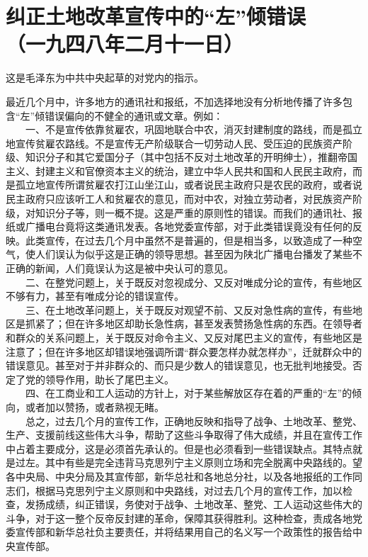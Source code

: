 \documentclass[cn,11pt,chinese]{elegantbook}
\def\myformat#1{\hfil\hfil #1}
\begin{document}
\newpage\section*{\myformat{纠正土地改革宣传中的“左”倾错误}\\\myformat{（一九四八年二月十一日）}}
\begin{introduction}\item  这是毛泽东为中共中央起草的对党内的指示。\end{introduction}
最近几个月中，许多地方的通讯社和报纸，不加选择地没有分析地传播了许多包含“左”倾错误偏向的不健全的通讯或文章。例如：\\
　　一、不是宣传依靠贫雇农，巩固地联合中农，消灭封建制度的路线，而是孤立地宣传贫雇农路线。不是宣传无产阶级联合一切劳动人民、受压迫的民族资产阶级、知识分子和其它爱国分子（其中包括不反对土地改革的开明绅士），推翻帝国主义、封建主义和官僚资本主义的统治，建立中华人民共和国和人民民主政府，而是孤立地宣传所谓贫雇农打江山坐江山，或者说民主政府只是农民的政府，或者说民主政府只应该听工人和贫雇农的意见，而对中农，对独立劳动者，对民族资产阶级，对知识分子等，则一概不提。这是严重的原则性的错误。而我们的通讯社、报纸或广播电台竟将这类通讯发表。各地党委宣传部，对于此类错误竟没有任何的反映。此类宣传，在过去几个月中虽然不是普遍的，但是相当多，以致造成了一种空气，使人们误认为似乎这是正确的领导思想。甚至因为陕北广播电台播发了某些不正确的新闻，人们竟误认为这是被中央认可的意见。\\
　　二、在整党问题上，关于既反对忽视成分、又反对唯成分论的宣传，有些地区不够有力，甚至有唯成分论的错误宣传。\\
　　三、在土地改革问题上，关于既反对观望不前、又反对急性病的宣传，有些地区是抓紧了；但在许多地区却助长急性病，甚至发表赞扬急性病的东西。在领导者和群众的关系问题上，关于既反对命令主义、又反对尾巴主义的宣传，有些地区是注意了；但在许多地区却错误地强调所谓“群众要怎样办就怎样办”，迁就群众中的错误意见。甚至对于并非群众的、而只是少数人的错误意见，也无批判地接受。否定了党的领导作用，助长了尾巴主义。\\
　　四、在工商业和工人运动的方针上，对于某些解放区存在着的严重的“左”的倾向，或者加以赞扬，或者熟视无睹。\\
　　总之，过去几个月的宣传工作，正确地反映和指导了战争、土地改革、整党、生产、支援前线这些伟大斗争，帮助了这些斗争取得了伟大成绩，并且在宣传工作中占着主要成分，这是必须首先承认的。但是也必须看到一些错误缺点。其特点就是过左。其中有些是完全违背马克思列宁主义原则立场和完全脱离中央路线的。望各中央局、中央分局及其宣传部，新华总社和各地总分社，以及各地报纸的工作同志们，根据马克思列宁主义原则和中央路线，对过去几个月的宣传工作，加以检查，发扬成绩，纠正错误，务使对于战争、土地改革、整党、工人运动这些伟大的斗争，对于这一整个反帝反封建的革命，保障其获得胜利。这种检查，责成各地党委宣传部和新华总社负主要责任，并将结果用自己的名义写一个政策性的报告给中央宣传部。\\
\end{document}
